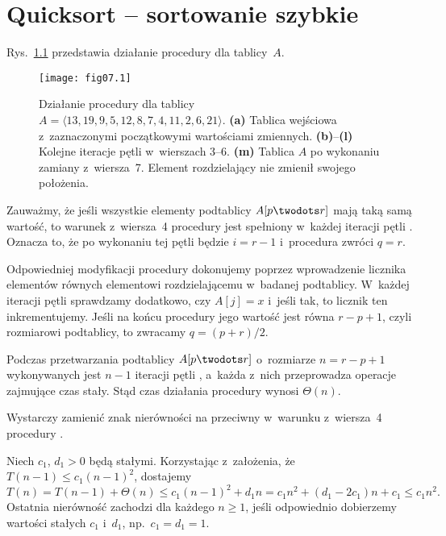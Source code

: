 \chapter{Quicksort -- sortowanie szybkie}


\exercise %
Rys.~\ref{fig:7.1-1} przedstawia działanie procedury  dla tablicy~$A$.
\begin{figure}[ht]
	\begin{center}
		\texttt{[image: fig07.1]}
	\end{center}
	\caption{Działanie procedury  dla tablicy $A=\langle13,19,9,5,12,8,7,4,11,2,6,21\rangle$. {\sffamily\bfseries(a)} Tablica wejściowa z~zaznaczonymi początkowymi wartościami zmiennych. {\sffamily\bfseries(b)}--{\sffamily\bfseries(l)} Kolejne iteracje pętli  w~wierszach 3--6. {\sffamily\bfseries(m)} Tablica $A$ po wykonaniu zamiany z~wiersza~7. Element rozdzielający nie zmienił swojego położenia.} \label{fig:7.1-1}
\end{figure}

\exercise %
Zauważmy, że jeśli wszystkie elementy podtablicy $A[p\twodots r]$ mają taką samą wartość, to warunek z~wiersza~4 procedury  jest spełniony w~każdej iteracji pętli . Oznacza to, że po wykonaniu tej pętli będzie $i=r-1$ i~procedura zwróci $q=r$.

Odpowiedniej modyfikacji procedury dokonujemy poprzez wprowadzenie licznika elementów równych elementowi rozdzielającemu w~badanej podtablicy. W~każdej iteracji pętli  sprawdzamy dodatkowo, czy $A[j]=x$ i~jeśli tak, to licznik ten inkrementujemy. Jeśli na końcu procedury jego wartość jest równa $r-p+1$, czyli rozmiarowi podtablicy, to zwracamy $q=(p+r)/2$.

\exercise %
Podczas przetwarzania podtablicy $A[p\twodots r]$ o~rozmiarze $n=r-p+1$ wykonywanych jest $n-1$ iteracji pętli , a~każda z~nich przeprowadza operacje zajmujące czas stały. Stąd czas działania procedury  wynosi $\Theta(n)$.

\exercise %
Wystarczy zamienić znak nierówności na przeciwny w~warunku z~wiersza~4 procedury .


\exercise %
Niech $c_1$, $d_1>0$ będą stałymi. Korzystając z~założenia, że $T(n-1)\le c_1(n-1)^2$, dostajemy
\[
	T(n) = T(n-1)+\Theta(n) \le c_1(n-1)^2+d_1n = c_1n^2+(d_1-2c_1)n+c_1 \le c_1n^2.
\]
Ostatnia nierówność zachodzi dla każdego $n\ge1$, jeśli odpowiednio dobierzemy wartości stałych $c_1$ i~$d_1$, np.\ $c_1=d_1=1$.

